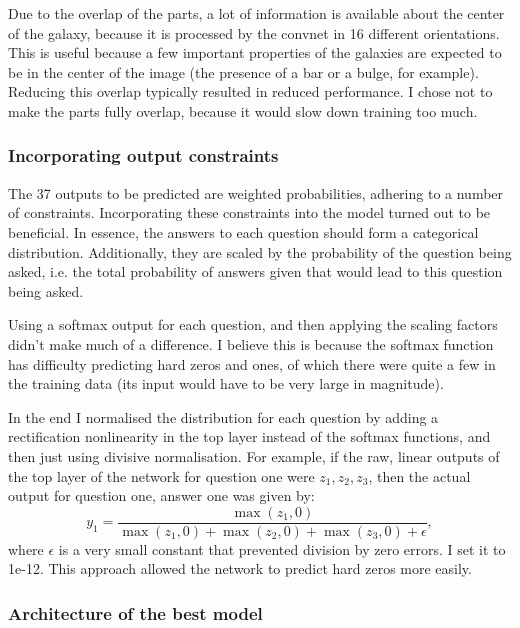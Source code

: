 \documentclass[a4paper,10pt]{article}
\begin{document}
Due to the overlap of the parts, a lot of information is available about the center of the galaxy, because it is processed by the convnet in 16 different orientations. This is useful because a few important properties of the galaxies are expected to be in the center of the image (the presence of a bar or a bulge, for example). Reducing this overlap typically resulted in reduced performance. I chose not to make the parts fully overlap, because it would slow down training too much.

\subsubsection{Incorporating output constraints}
\label{sec:output-constraints}
The 37 outputs to be predicted are weighted probabilities, adhering to a number of constraints. Incorporating these constraints into the model turned out to be beneficial. In essence, the answers to each question should form a categorical distribution. Additionally, they are scaled by the probability of the question being asked, i.e. the total probability of answers given that would lead to this question being asked.

Using a softmax output for each question, and then applying the scaling factors didn't make much of a difference. I believe this is because the softmax function has difficulty predicting hard zeros and ones, of which there were quite a few in the training data (its input would have to be very large in magnitude).

In the end I normalised the distribution for each question by adding a rectification nonlinearity in the top layer instead of the softmax functions, and then just using divisive normalisation. For example, if the raw, linear outputs of the top layer of the network for question one were $z_1, z_2, z_3$, then the actual output for question one, answer one was given by:
\begin{equation}
y_1 = \dfrac{\max(z_1, 0)}{\max(z_1, 0) + \max(z_2, 0) + \max(z_3, 0) + \epsilon},
\end{equation}
where $\epsilon$ is a very small constant that prevented division by zero errors. I set it to 1e-12. This approach allowed the network to predict hard zeros more easily.

\subsubsection{Architecture of the best model}
\end{document}
